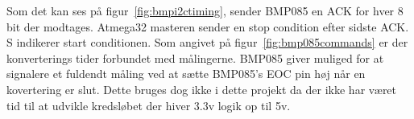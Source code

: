 Som det kan ses på figur~\ref{fig:bmpi2ctiming}, sender BMP085 en ACK for hver 8 bit der modtages. Atmega32 masteren sender en stop condition efter sidste ACK. S indikerer start conditionen.
Som angivet på figur~\ref{fig:bmp085commands} er der konverterings tider forbundet med målingerne. BMP085 giver muliged for at signalere et fuldendt måling ved at sætte BMP085’s EOC pin høj når en kovertering er slut. Dette bruges dog ikke i dette projekt da der ikke har været tid til at udvikle kredsløbet der hiver 3.3v logik op til 5v.




